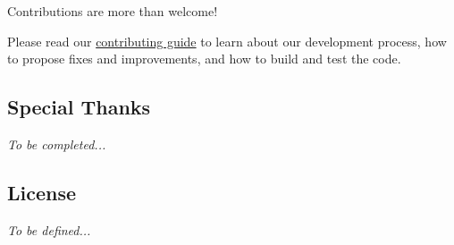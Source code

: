 Contributions are more than welcome!

Please read our \hyperlink{_c_o_n_t_r_i_b_u_t_i_n_g_8md}{contributing guide} to learn about our development process, how to propose fixes and improvements, and how to build and test the code.

\subsection*{Special Thanks}

{\itshape To be completed...}

\subsection*{License}

{\itshape To be defined...} 